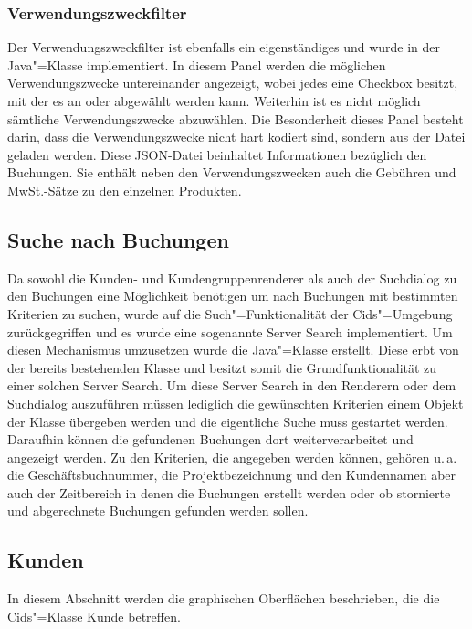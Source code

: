 \subsubsection{Verwendungszweckfilter}
Der Verwendungszweckfilter ist ebenfalls ein eigenständiges  und wurde in der Java"=Klasse  implementiert.
In diesem Panel werden die möglichen Verwendungszwecke untereinander angezeigt, wobei jedes eine Checkbox besitzt, mit der es an oder abgewählt werden kann. Weiterhin ist es nicht möglich sämtliche Verwendungszwecke abzuwählen.
Die Besonderheit dieses Panel besteht darin, dass die Verwendungszwecke nicht hart kodiert sind, sondern aus der  Datei geladen werden.
Diese \ac{JSON}-Datei beinhaltet Informationen bezüglich den Buchungen. Sie enthält neben den Verwendungszwecken auch die Gebühren und MwSt.-Sätze zu den einzelnen Produkten. 

\subsection{Suche nach Buchungen} \label{subsec:serversearch}
Da sowohl die Kunden- und Kundengruppenrenderer als auch der Suchdialog zu den Buchungen eine Möglichkeit benötigen um nach Buchungen mit bestimmten Kriterien zu suchen, wurde auf die Such"=Funktionalität der Cids"=Umgebung zurückgegriffen und es wurde eine sogenannte Server Search implementiert.
Um diesen Mechanismus umzusetzen wurde die Java"=Klasse  erstellt.
Diese erbt von der bereits bestehenden Klasse  und besitzt somit die Grundfunktionalität zu einer solchen Server Search.
Um diese Server Search in den Renderern oder dem Suchdialog auszuführen müssen lediglich die gewünschten Kriterien einem Objekt der Klasse  übergeben werden und die eigentliche Suche muss gestartet werden.
Daraufhin können die gefundenen Buchungen dort weiterverarbeitet und angezeigt werden.
Zu den Kriterien, die angegeben werden können, gehören u.\,a. die Geschäftsbuchnummer, die Projektbezeichnung und den Kundennamen aber auch der Zeitbereich in denen die Buchungen erstellt werden oder ob stornierte und abgerechnete Buchungen gefunden werden sollen.

\subsection{Kunden}
In diesem Abschnitt werden die graphischen Oberflächen beschrieben, die die Cids"=Klasse Kunde betreffen.
